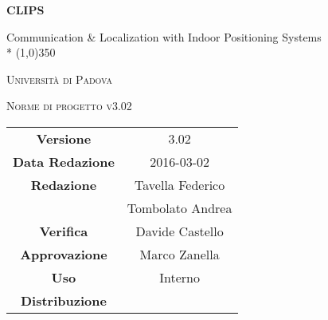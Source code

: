 \documentclass[a4paper,12pt]{article}
\author{Tavella Federico, Tombolato Andrea}
\date{04/03/2016}
\begin{document}
\begin{titlepage}
	\centering
	{\huge\bfseries CLIPS\par}
	Communication \& Localization with Indoor Positioning Systems \\*
	\line(1,0){350} \\
	{\scshape\LARGE Università di Padova \par}
	\vspace{1cm}
	{\scshape\Large Norme di progetto v3.02 \par}
	\logo
	\newpage
		\begin{tabular}{c|c}
			{\hfill \textbf{Versione}} 			& 3.02					    \\
			{\hfill\textbf{Data Redazione}} 	& 2016-03-02		 	    \\ 
			{\hfill\textbf{Redazione}} 			&  Tavella Federico			\\ 
												&  Tombolato Andrea			\\
			{\hfill\textbf{Verifica}} 			& Davide Castello	\\
			{\hfill\textbf{Approvazione}} 		&  Marco Zanella		\\
			{\hfill\textbf{Uso}} 				&  Interno					\\
			{\hfill\textbf{Distribuzione}} 		&  \leaf					\\
		\end{tabular}
	\end{titlepage}
	\newpage
	\pagestyle{myfront}
	
		\newpage
			\tableofcontents
		\newpage
			\listoffigures	
	\label{LastFrontPage}
	\newpage
	\pagestyle{mymain}
         
    \newpage
		

	\newpage
		
	
	\newpage
		
	
	\newpage
		
		
	\label{LastPage}
\end{document}
